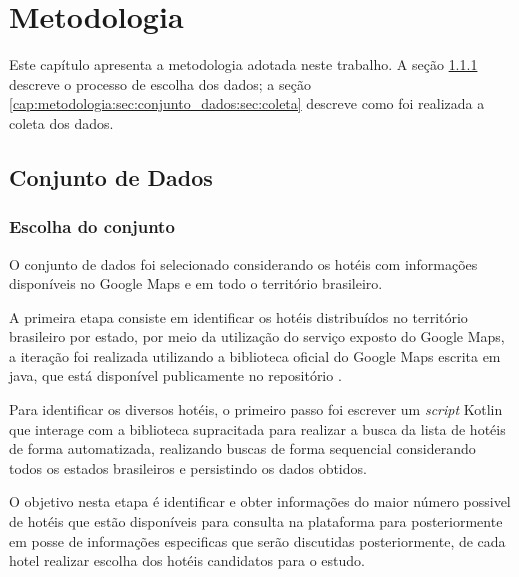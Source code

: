 \chapter{Metodologia}
\label{cap:metodologia}

Este capítulo apresenta a metodologia adotada neste trabalho. A seção \ref{cap:metodologia:sec:conjunto_dados:sec:escolha_conjunto} descreve o processo de escolha dos dados; a seção \ref{cap:metodologia:sec:conjunto_dados:sec:coleta} descreve como foi realizada a coleta dos dados.

\section{Conjunto de Dados}
\label{cap:metodologia:sec:conjunto_dados}

\subsection{Escolha do conjunto}
\label{cap:metodologia:sec:conjunto_dados:sec:escolha_conjunto}

O conjunto de dados foi selecionado considerando os hotéis com informações disponíveis no Google Maps e em todo o território brasileiro.

A primeira etapa consiste em identificar os hotéis distribuídos no território brasileiro por estado, por meio da utilização do serviço exposto do Google Maps, a iteração foi realizada utilizando a biblioteca oficial do Google Maps escrita em java, que está disponível publicamente no repositório .

Para identificar os diversos hotéis, o primeiro passo foi escrever um \emph{script} Kotlin  que interage com a biblioteca supracitada para realizar a busca da lista de hotéis de forma automatizada, realizando buscas de forma sequencial considerando todos os estados brasileiros e persistindo os dados obtidos.

O objetivo nesta etapa é identificar e obter informações do maior número possivel de hotéis que estão disponíveis para consulta na plataforma para posteriormente em posse de informações especificas que serão discutidas posteriormente, de cada hotel realizar escolha dos hotéis candidatos para o estudo.

